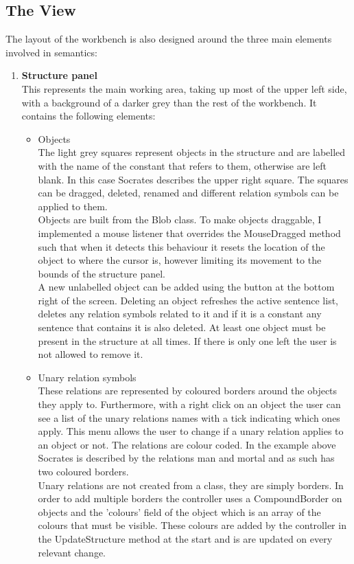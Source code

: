 \documentclass{report}
\begin{document}
\subsection{The View}
The layout of the workbench is also designed around the three main elements 
involved in semantics:

\begin{enumerate}
\item \textbf{Structure panel} \\
This represents the main working area, taking up most of the upper left side, 
with a background of a darker grey than the rest of the workbench. It contains 
the following elements:

\begin{itemize}
\item Objects \\
The light grey squares represent objects in the structure and are labelled with 
the name of the constant that refers to them, otherwise are left blank. In this 
case Socrates describes the upper right square. The squares can be dragged, 
deleted, renamed and different relation symbols can be applied to them. \\
Objects are built from the Blob class. To make objects draggable, I implemented 
a mouse listener that overrides the MouseDragged method such that when it 
detects this behaviour it resets the location of the object to where the cursor 
is, however limiting its movement to the bounds of the structure panel. \\
A new unlabelled object can be added using the button at the bottom right of the 
screen. Deleting an object refreshes the active sentence list, deletes any 
relation symbols related to it and if it is a constant any sentence that 
contains it is also deleted. At least one object must be present in the 
structure at all times. If there is only one left the user is not allowed to 
remove it.

\item Unary relation symbols \\
These relations are represented by coloured borders around the objects they 
apply to. Furthermore, with a right click on an object the user can see a list 
of the unary relations names with a tick indicating which ones apply. This menu 
allows the user to change if a unary relation applies to an object or not. The 
relations are colour coded. In the example above Socrates is described by the 
relations man and mortal and as such has two coloured borders. \\
Unary relations are not created from a class, they are simply borders. In order
to add multiple borders the controller uses a CompoundBorder on objects and the
'colours' field of the object which is an array of the colours that must be
visible. These colours are added by the controller in the UpdateStructure method
at the start and is are updated on every relevant change.


\end{itemize}
\end{enumerate}
\end{document}
